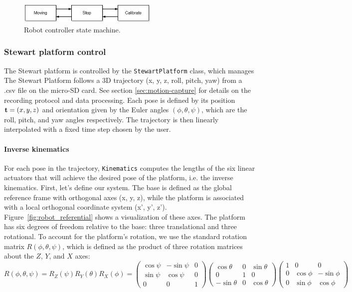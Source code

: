 \begin{figure}[H]
\centering
\includegraphics[width=0.6\textwidth]{figures/state_machine.drawio.png}
\caption{Robot controller state machine.}
\label{fig:state_machine}
\end{figure}

\subsubsection{Stewart platform control}

The Stewart platform is controlled by the \texttt{StewartPlatform} class, which manages 
The Stewart Platform follows a 3D trajectory (x, y, z, roll, pitch, yaw) from a .csv file on the micro-SD card.
See section \ref{sec:motion-capture} for details on the recording protocol and data processing.
Each pose is defined by its position ${\bf t}=(x,y,z)$ and orientation given by the Euler angles $(\phi,\theta,\psi)$,
 which are the roll, pitch, and yaw angles respectively.
The trajectory is then linearly interpolated with a fixed time step chosen by the user.

\paragraph{Inverse kinematics}
For each pose in the trajectory, \texttt{Kinematics} computes the lengths of the six linear actuators that will achieve 
the desired pose of the platform, i.e. the inverse kinematics. First, let's define our system. The base is defined as the 
global reference frame with orthogonal axes (x, y, z), while the platform is associated with a local orthogonal coordinate 
system (x', y', z'). Figure~\ref{fig:robot_referential} shows a visualization of these axes. The platform has six degrees 
of freedom relative to the base: three translational and three rotational. To account for the platform's rotation, we use the 
standard rotation matrix $R(\phi,\theta,\psi)$, which is defined as the product of three rotation matrices about 
the $Z$, $Y$, and $X$ axes:
\[
R(\phi,\theta,\psi) = R_Z(\psi) R_Y(\theta) R_X(\phi) =
\begin{pmatrix}
\cos\psi & -\sin\psi & 0 \\
\sin\psi & \cos\psi & 0 \\
0 & 0 & 1
\end{pmatrix}
\begin{pmatrix}
\cos\theta & 0 & \sin\theta \\
0 & 1 & 0 \\
-\sin\theta & 0 & \cos\theta
\end{pmatrix}
\begin{pmatrix}
1 & 0 & 0 \\
0 & \cos\phi & -\sin\phi \\
0 & \sin\phi & \cos\phi
\end{pmatrix}
\]

